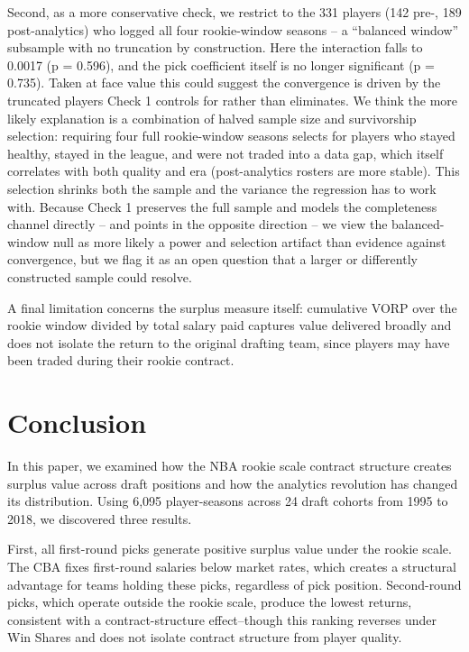 \documentclass[12pt,letterpaper]{article}
\begin{document}
Second, as a more conservative check, we restrict to the 331 players (142 pre-, 189 post-analytics) who logged all four rookie-window seasons -- a ``balanced window'' subsample with no truncation by construction. Here the interaction falls to 0.0017 (p = 0.596), and the pick coefficient itself is no longer significant (p = 0.735). Taken at face value this could suggest the convergence is driven by the truncated players Check 1 controls for rather than eliminates. We think the more likely explanation is a combination of halved sample size and survivorship selection: requiring four full rookie-window seasons selects for players who stayed healthy, stayed in the league, and were not traded into a data gap, which itself correlates with both quality and era (post-analytics rosters are more stable). This selection shrinks both the sample and the variance the regression has to work with. Because Check 1 preserves the full sample and models the completeness channel directly -- and points in the opposite direction -- we view the balanced-window null as more likely a power and selection artifact than evidence against convergence, but we flag it as an open question that a larger or differently constructed sample could resolve.

A final limitation concerns the surplus measure itself: cumulative VORP over the rookie window divided by total salary paid captures value delivered broadly and does not isolate the return to the original drafting team, since players may have been traded during their rookie contract.

\section{Conclusion}

In this paper, we examined how the NBA rookie scale contract structure creates surplus value across draft positions and how the analytics revolution has changed its distribution. Using 6,095 player-seasons across 24 draft cohorts from 1995 to 2018, we discovered three results.

First, all first-round picks generate positive surplus value under the rookie scale. The CBA fixes first-round salaries below market rates, which creates a structural advantage for teams holding these picks, regardless of pick position. Second-round picks, which operate outside the rookie scale, produce the lowest returns, consistent with a contract-structure effect--though this ranking reverses under Win Shares and does not isolate contract structure from player quality.
\end{document}
